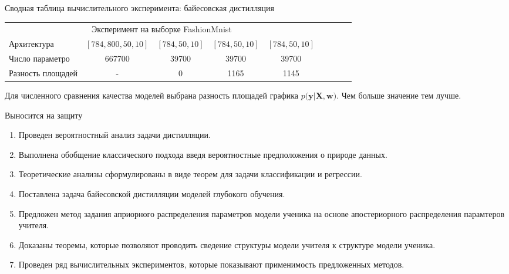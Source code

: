 \documentclass[10pt,pdf,hyperref={unicode}]{beamer}
\begin{document}
\begin{frame}{Сводная таблица вычислительного эксперимента: байесовская дистилляция}
\begin{table}[]
\begin{center}
{\begin{tabular}{|l|c|c|c|c|llll}
\multicolumn{5}{|c|}{Эксперимент на выборке FashionMnist}                                                     &                      &                      &                      &                      \\ \cline{1-5}
Архитектура           & $[784,800,50,10]$& $[784,50,10]$   & $[784,50,10]$  & $[784,50,10]$      &                      &                      &                      &                      \\ \cline{1-5}
Число параметро    &   667700                     &     39700                     &      39700                   &      39700                       &                      &                      &                      &                      \\ \cline{1-5}
Разность площадей   & -                           & 0                       &  1165               & 1145                    &                      &                      &                      &                      \\ \cline{1-5}
\end{tabular}
}
\end{center}
\end{table}

Для численного сравнения качества моделей выбрана разность площадей графика $p\bigr(\mathbf{y}|\mathbf{X}, \mathbf{w}\bigr)$. Чем больше значение тем лучше.

\end{frame}

\begin{frame}{Выносится на защиту}
\justifying
	\begin{enumerate}
	\justifying
		\item Проведен вероятностный анализ задачи дистилляции.
		\item Выполнена обобщение классического подхода введя вероятностные предположения о природе данных.
		\item Теоретические анализы сформулированы в виде теорем для задачи классификации и регрессии.
		\item Поставлена задача байесовской дистилляции моделей глубокого обучения.
		\item Предложен метод задания априорного распределения параметров модели ученика на основе апостериорного распределения парамтеров учителя.
		\item Доказаны теоремы, которые позволяют проводить сведение структуры модели учителя к структуре модели ученика.
		\item Проведен ряд вычислительных экспериментов, которые показывают применимость предложенных методов.
	\end{enumerate}

\end{frame}
\end{document}
